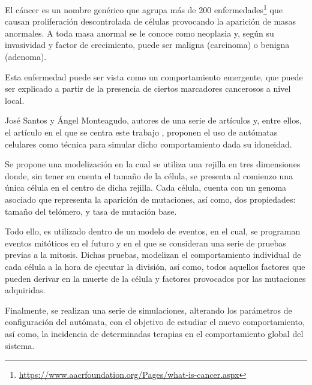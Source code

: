 El cáncer es un nombre genérico que agrupa más de 200 enfermedades\footnote{\url{https://www.aacrfoundation.org/Pages/what-is-cancer.aspx}}
que causan proliferación descontrolada de células provocando la aparición de masas anormales. A toda masa anormal se
le conoce como neoplasia y, según su invasividad y factor de crecimiento, puede ser maligna (carcinoma) o benigna (adenoma).

Esta enfermedad puede ser vista como un comportamiento emergente, que puede ser explicado a
partir de la presencia de ciertos marcadores cancerosos a nivel local.

José Santos y Ángel Monteagudo, autores de una serie de artículos \cite{jsantos-amonteagudo-2012} \cite{jsantos-amonteagudo-2013} \cite{jsantos-amonteagudo-2015} y, entre ellos, el artículo
en el que se centra este trabajo \cite{jsantos-amonteagudo-1-2014}, proponen el uso de autómatas
celulares como técnica para simular dicho comportamiento dada su idoneidad.

Se propone una modelización en la cual se utiliza una rejilla en tres dimensiones donde, sin
tener en cuenta el tamaño de la célula, se presenta al comienzo una única célula en el centro de dicha
rejilla. Cada célula, cuenta con un genoma asociado que representa la aparición de mutaciones,
así como, dos propiedades: tamaño del telómero, y tasa de mutación base.

Todo ello, es utilizado dentro de un modelo de eventos, en el cual, se programan eventos mitóticos
en el futuro y en el que se consideran una serie de pruebas previas a la mitosis. Dichas pruebas,
modelizan el comportamiento individual de cada célula a la hora de ejecutar la división, así como,
todos aquellos factores que pueden derivar en la muerte de la célula y factores provocados
por las mutaciones adquiridas.

Finalmente, se realizan una serie de simulaciones, alterando los parámetros de configuración del
autómata, con el objetivo de estudiar el nuevo comportamiento, así como, la incidencia
de determinadas terapias en el comportamiento global del sistema.
